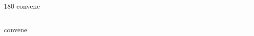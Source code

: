 
\begin{frame}
\begin{center}
\begin{turn}{180}
{\fontsize{2.5cm}{1em}\selectfont convene}
\end{turn}
\vspace{1em}\par  
\hrule
\vspace{1em}\par  
{\fontsize{2.5cm}{1em}\selectfont convene}
\end{center}
\end{frame}
